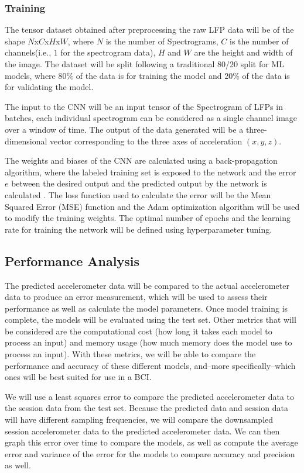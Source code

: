 \documentclass[12pt]{article}
\begin{document}
\subsubsection{Training} 

The tensor dataset obtained after preprocessing the raw LFP data will be of the shape $N$x$C$x$H$x$W$, where $N$ is the number of Spectrograms, $C$ is the number of channels(i.e., $1$ for the spectrogram data), $H$ and $W$ are the height and width of the image. The dataset will be split following a traditional 80/20 split for ML models, where 80\% of the data is for training the model and 20\% of the data is for validating the model.

The input to the CNN will be an input tensor of the Spectrogram of LFPs in batches, each individual spectrogram can be considered as a single channel image over a window of time. The output of the data generated will be a three-dimensional vector corresponding to the three axes of acceleration $(x, y, z)$.

The weights and biases of the CNN are calculated using a back-propagation algorithm, where the labeled training set is exposed to the network and the error $e$ between the desired output and the predicted output by the network is calculated \cite{hecht1992}. The loss function used to calculate the error will be the Mean Squared Error (MSE) function and the Adam optimization algorithm will be used to modify the training weights. The optimal number of epochs and the learning rate for training the network will be defined using hyperparameter tuning.

\subsection{Performance Analysis}

The predicted accelerometer data will be compared to the actual accelerometer data to produce an error measurement, which will be used to assess their performance as well as calculate the model parameters. Once model training is complete, the models will be evaluated using the test set. Other metrics that will be considered are the computational cost (how long it takes each model to process an input) and memory usage (how much memory does the model use to process an input). With these metrics, we will be able to compare the performance and accuracy of these different models, and--more specifically--which ones will be best suited for use in a BCI.

We will use a least squares error to compare the predicted accelerometer data to the session data from the test set. Because the predicted data and session data will have different sampling frequencies, we will compare the downsampled session accelerometer data to the predicted accelerometer data. We can then graph this error over time to compare the models, as well as compute the average error and variance of the error for the models to compare accuracy and precision as well.
\end{document}
